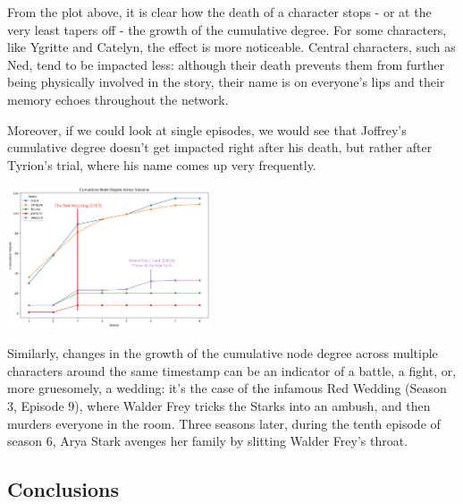 \documentclass[10pt,twocolumn,letterpaper]{article}
\begin{document}
From the plot above, it is clear how the death of a character stops - or at the very least tapers off - the growth of the cumulative degree. For some characters, like Ygritte and Catelyn, the effect is more noticeable. Central characters, such as Ned, tend to be impacted less: although their death prevents them from further being physically involved in the story, their name is on everyone's lips and their memory echoes throughout the network.

Moreover, if we could look at single episodes, we would see that Joffrey's cumulative degree doesn't get impacted right after his death, but rather after Tyrion's trial, where his name comes up very frequently.

\begin{center}
    \includegraphics[width=0.45\textwidth]{img/all_seasons/csum_degree_redwedding.jpg}
\end{center}

Similarly, changes in the growth of the cumulative node degree across multiple characters around the same timestamp can be an indicator of a battle, a fight, or, more gruesomely, a wedding: it's the case of the infamous Red Wedding (Season 3, Episode 9), where Walder Frey tricks the Starks into an ambush, and then murders everyone in the room. Three seasons later, during the tenth episode of season 6, Arya Stark avenges her family by slitting Walder Frey's throat.

\subsection{Conclusions}

{\small


}
\end{document}

